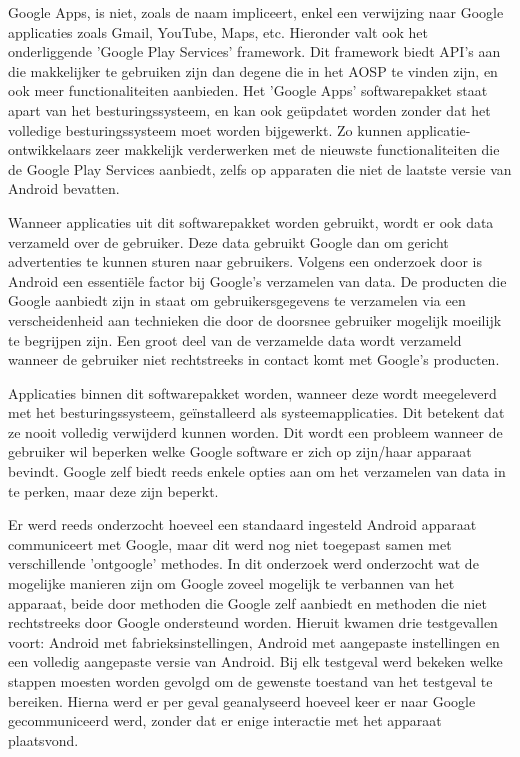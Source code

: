 Google Apps, is niet, zoals de naam impliceert, enkel een verwijzing naar Google applicaties zoals Gmail, YouTube, Maps, etc. Hieronder valt ook het onderliggende 'Google Play Services' framework. Dit framework biedt API's aan die makkelijker te gebruiken zijn dan degene die in het AOSP te vinden zijn, en ook meer functionaliteiten aanbieden. Het 'Google Apps' softwarepakket staat apart van het besturingssysteem, en kan ook geüpdatet worden zonder dat het volledige besturingssysteem moet worden bijgewerkt. Zo kunnen applicatie-ontwikkelaars zeer makkelijk verderwerken met de nieuwste functionaliteiten die de Google Play Services aanbiedt, zelfs op apparaten die niet de laatste versie van Android bevatten.

Wanneer applicaties uit dit softwarepakket worden gebruikt, wordt er ook data verzameld over de gebruiker. Deze data gebruikt Google dan om gericht advertenties te kunnen sturen naar gebruikers. Volgens een onderzoek door \cite{schmidt_google-data-collection} is Android een essentiële factor bij Google's verzamelen van data. De producten die Google aanbiedt zijn in staat om gebruikersgegevens te verzamelen via een verscheidenheid aan technieken die door de doorsnee gebruiker mogelijk moeilijk te begrijpen zijn. Een groot deel van de verzamelde data wordt verzameld wanneer de gebruiker niet rechtstreeks in contact komt met Google's producten. 

Applicaties binnen dit softwarepakket worden, wanneer deze wordt meegeleverd met het besturingssysteem, geïnstalleerd als systeemapplicaties. Dit betekent dat ze nooit volledig verwijderd kunnen worden. Dit wordt een probleem wanneer de gebruiker wil beperken welke Google software er zich op zijn/haar apparaat bevindt. Google zelf biedt reeds enkele opties aan om het verzamelen van data in te perken, maar deze zijn beperkt.

Er werd reeds onderzocht hoeveel een standaard ingesteld Android apparaat communiceert met Google, maar dit werd nog niet toegepast samen met verschillende 'ontgoogle' methodes. In dit onderzoek werd onderzocht wat de mogelijke manieren zijn om Google zoveel mogelijk te verbannen van het apparaat, beide door methoden die Google zelf aanbiedt en methoden die niet rechtstreeks door Google ondersteund worden. Hieruit kwamen drie testgevallen voort: Android met fabrieksinstellingen, Android met aangepaste instellingen en een volledig aangepaste versie van Android. Bij elk testgeval werd bekeken welke stappen moesten worden gevolgd om de gewenste toestand van het testgeval te bereiken. Hierna werd er per geval geanalyseerd hoeveel keer er naar Google gecommuniceerd werd, zonder dat er enige interactie met het apparaat plaatsvond. 

